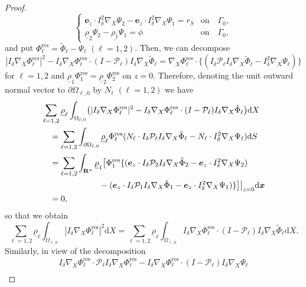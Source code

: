 \documentclass[11pt,leqno]{article}
\numberwithin{equation}{section}
\numberwithin{figure}{section}
\begin{document}
\begin{proof}
\[\begin{cases}
 \bm{e}_z\cdot I_\delta^2\nabla_X\Psi_2-\bm{e}_z\cdot I_\delta^2\nabla_X\Psi_1 = r_S & \mbox{on}\quad \Gamma_0, \\
 \underline{\rho}_2\Psi_2-\underline{\rho_1}\Psi_1 = \phi & \mbox{on}\quad \Gamma_0,
\end{cases}
\]
%
and put $\Phi_\ell^\mathrm{res}=\tilde{\Phi}_\ell-\Psi_\ell$ $(\ell=1,2)$. 
Then, we can decompose 
%
\[
|I_\delta\nabla_X\Phi_\ell^\mathrm{res}|^2
 - I_\delta\nabla_X\Phi_\ell^\mathrm{res}\cdot(I-\mathcal{P}_\ell)I_\delta\nabla_X\tilde{\Phi}_\ell
= \nabla_X\Phi_\ell^\mathrm{res}\cdot\{ (I_\delta\mathcal{P}_\ell I_\delta\nabla_X\tilde{\Phi}_\ell
 - I_\delta^2\nabla_X\Psi_\ell) \}
\]
%
for $\ell=1,2$ and $\underline{\rho}_1\Phi_1^\mathrm{res}= \underline{\rho}_2\Phi_2^\mathrm{res}$ on $z=0$. 
Therefore, denoting the unit outward normal vector to $\partial\Omega_{\ell,0}$ by $N_\ell$ $(\ell=1,2)$ we have 
%
\begin{align*}
& \sum_{\ell=1,2}\underline{\rho}_\ell\int_{\Omega_{\ell,0}} \bigl(
 |I_\delta\nabla_X\Phi_\ell^\mathrm{res}|^2
 - I_\delta\nabla_X\Phi_\ell^\mathrm{res}\cdot(I-\mathcal{P}_\ell)I_\delta\nabla_X\tilde{\Phi}_\ell \bigr)\mathrm{d}X \\
&\quad= \sum_{\ell=1,2}\int_{\partial\Omega_{\ell,0}}
 \underline{\rho}_\ell\Phi_\ell^\mathrm{res}(N_\ell\cdot I_\delta\mathcal{P}_\ell I_\delta\nabla_X\tilde{\Phi}_\ell
  - N_\ell\cdot I_\delta^2\nabla_X\Psi_\ell) \mathrm{d}S \\
&\quad= \sum_{\ell=1,2}\int_{\mathbf{R}^n}
 \underline{\rho}_1\bigl[ \Phi_1^\mathrm{res}\{ (\bm{e}_z\cdot I_\delta\mathcal{P}_2 I_\delta\nabla_X\tilde{\Phi}_2
   - \bm{e}_z\cdot I_\delta^2\nabla_X\Psi_2) \\
&\makebox[7em]{}
  - (\bm{e}_z\cdot I_\delta\mathcal{P}_1 I_\delta\nabla_X\tilde{\Phi}_1
   - \bm{e}_z\cdot I_\delta^2\nabla_X\Psi_1) \} \bigr]\bigr|_{z=0} \mathrm{d}\bm{x} \\
&\quad=0,
\end{align*}
%
so that we obtain 
%
\[
\sum_{\ell=1,2}\underline{\rho}_\ell\int_{\Omega_{\ell,0}}
 |I_\delta\nabla_X\Phi_\ell^\mathrm{res}|^2 \mathrm{d}X
= \sum_{\ell=1,2}\underline{\rho}_\ell\int_{\Omega_{\ell,0}}
 I_\delta\nabla_X\Phi_\ell^\mathrm{res}\cdot(I-\mathcal{P}_\ell)I_\delta\nabla_X\tilde{\Phi}_\ell \mathrm{d}X.
\]
%
Similarly, in view of the decomposition
%
\begin{align*}
 I_\delta\nabla_X\Phi_\ell^\mathrm{res} \cdot \mathcal{P}_\ell I_\delta\nabla_X\Phi_\ell^\mathrm{res}
 - I_\delta\nabla_X\Phi_\ell^\mathrm{res}\cdot(I-\mathcal{P}_\ell)I_\delta\nabla_X\Psi_\ell \\

\end{align*}
\end{proof}
\end{document}
